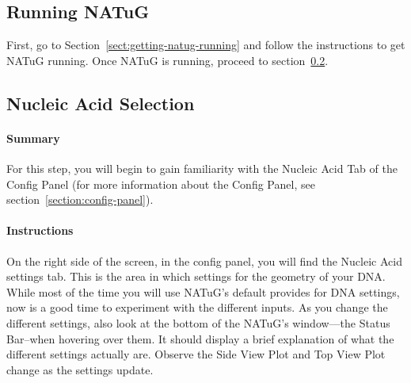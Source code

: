\documentclass[
titlepage,
fontsize=12pt
]{article}
\begin{document}
	\subsection{Running NATuG}
	First, go to Section~\ref{sect:getting-natug-running} and follow the instructions to get NATuG running. Once NATuG is running, proceed to section~\ref{sect:nucleic-acid-selection}.
	
	\subsection{Nucleic Acid Selection} \label{sect:nucleic-acid-selection}
	
	\paragraph{Summary} For this step, you will begin to gain familiarity with the Nucleic Acid Tab of the Config Panel (for more information about the Config Panel, see section~\ref{section:config-panel}).  
	
	\paragraph{Instructions} On the right side of the screen, in the config panel, you will find the Nucleic Acid settings tab. This is the area in which settings for the geometry of your DNA. While most of the time you will use NATuG's default provides for DNA settings, now is a good time to experiment with the different inputs. As you change the different settings, also look at the bottom of the NATuG's window---the Status Bar--when hovering over them. It should display a brief explanation of what the different settings actually are. Observe the Side View Plot and Top View Plot change as the settings update.
	
\end{document}
